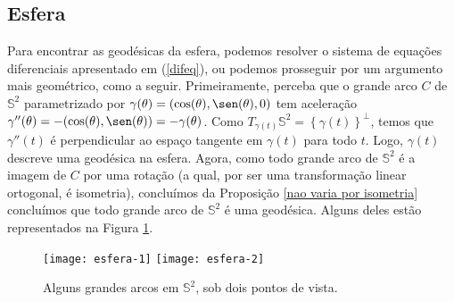 \subsection{Esfera}

Para encontrar as geodésicas da esfera, podemos resolver o sistema de equações diferenciais apresentado em (\ref{difeq}), ou podemos prosseguir por um argumento mais geométrico, como a seguir.
Primeiramente, perceba que o grande arco \( C \) de \( \mathbb{S}^{ 2 } \) parametrizado por \( \gamma ( \theta ) = ( \cos ( \theta ), \sen ( \theta ), 0 ) \) tem aceleração \( \gamma'' ( \theta ) = - ( \cos ( \theta ), \sen ( \theta ) ) = - \gamma ( \theta ) \).
Como \( T_{ \gamma ( t ) } \mathbb{S}^{ 2 } = \left\{ \gamma ( t ) \right\}^{ \perp } \), temos que \( \gamma'' ( t ) \) é perpendicular ao espaço tangente em \( \gamma ( t ) \) para todo \( t \).
Logo, \( \gamma ( t ) \) descreve uma geodésica na esfera.
Agora, como todo grande arco de \( \mathbb{S}^{ 2 } \) é a imagem de \( C \) por uma rotação (a qual, por ser uma transformação linear ortogonal, é isometria), concluímos da Proposição \ref{nao varia por isometria} concluímos que todo grande arco de \( \mathbb{S}^{ 2 } \) é uma geodésica.
Alguns deles estão representados na Figura \ref{geodesicas esfera}.

\begin{figure}[htb]
    \begin{center}
        \texttt{[image: esfera-1]}
        \texttt{[image: esfera-2]}
    \end{center}
    \caption{Alguns grandes arcos em \( \mathbb{S}^{ 2 } \), sob dois pontos de vista.}
    \label{geodesicas esfera}
\end{figure}
